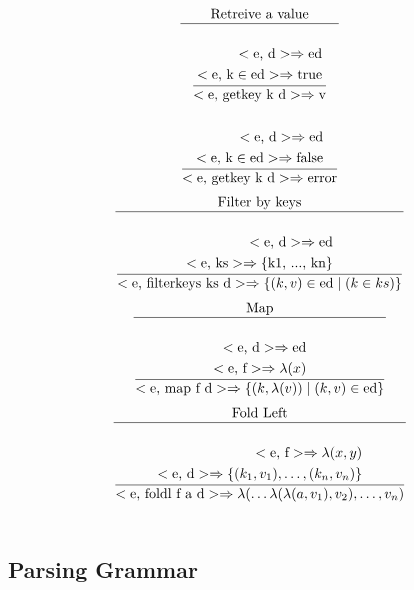 \documentclass[a4paper, 10pt]{article}
\newcommand{\te}[1]{\text{#1}}
\theoremstyle{plain}%
\theoremstyle{definition}
\theoremstyle{remark}
\begin{document}
\begin{gather*}
	\te{Retreive a value} \\ \hline \\
	\dfrac{	\begin{aligned}
		<\te{e, d}> \Rightarrow \te{ed} \\
		<\te{e, k} \in \te{ed}> \Rightarrow \te{true}
	\end{aligned}}{<\te{e, getkey k d}> \Rightarrow \te{v}} \\ \\
	\dfrac{	\begin{aligned}
		<\te{e, d}> \Rightarrow \te{ed} \\
		<\te{e, k} \in \te{ed}> \Rightarrow \te{false}
	\end{aligned}}{<\te{e, getkey k d}> \Rightarrow \te{error}}
\end{gather*}
\begin{gather*}
	\te{Filter by keys} \\ \hline \\
	\dfrac{	\begin{aligned}
		<\te{e, d}> \Rightarrow \te{ed} \\
		<\te{e, ks}> \Rightarrow \te{\{k1, ..., kn\}}
	\end{aligned}}{<\te{e, filterkeys ks d}> \Rightarrow \{ (k, v) \in \te{ed} \mid (k \in ks) \}}
\end{gather*}
\begin{gather*}
	\te{Map} \\ \hline \\
	\dfrac{	\begin{aligned}
		<\te{e, d}> \Rightarrow \te{ed} \\
		<\te{e, f}> \Rightarrow \lambda(x)
	\end{aligned}}
	{<\te{e, map f d}> \Rightarrow \{ (k, \lambda(v)) \mid (k, v) \in \te{ed}  \}}
\end{gather*}
\begin{gather*}
	\te{Fold Left} \\ \hline \\
	\dfrac{\begin{aligned}
		<\te{e, f}> \Rightarrow \lambda(x,y)  \\
		<\te{e, d}> \Rightarrow \{(k_1, v_1), \hdots, (k_n, v_n)\}
	\end{aligned}}{<\te{e, foldl f a d}> \Rightarrow \lambda( \hdots \lambda(\lambda(a, v_1), v_2), \hdots, v_n)} \\ \\
\end{gather*}

\fi

\clearpage

\begin{appendices}
  \section{Parsing Grammar}
  \label{grammar}
  
\end{appendices}



\end{document}
